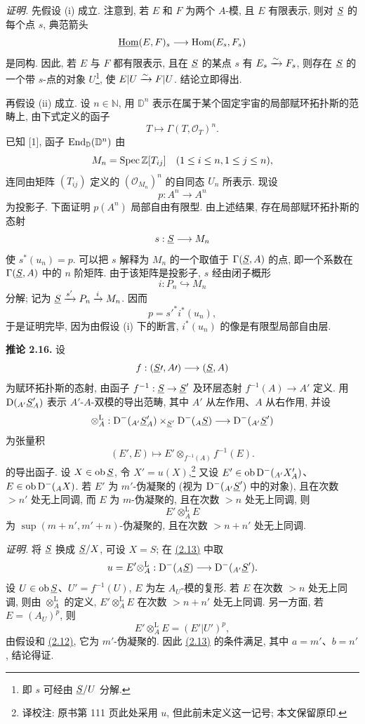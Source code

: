 \emph{证明.} 先假设 (i) 成立. 注意到, 若 \(E\) 和 \(F\) 为两个 \(A\)-模, 且 \(E\) 有限表示, 则对 \(\underline S\) 的每个点 \(s\), 典范箭头
\[
  \underline{\operatorname{Hom}}(E,F)_s\longrightarrow \operatorname{Hom}(E_s,F_s)
\]
是同构. 因此, 若 \(E\) 与 \(F\) 都有限表示, 且在 \(\underline S\) 的某点 \(s\) 有 \(E_s\xrightarrow{\sim} F_s\), 则存在 \(\underline S\) 的一个带 \(s\)-点的对象 \(U\)\footnote{即 \(s\) 可经由 \(\underline S/U\) 分解.}, 使 \(E|U\xrightarrow{\sim} F|U\). 结论立即得出.

再假设 (ii) 成立. 设 \(n\in\mathbb N\), 用 \(\mathbb D^n\) 表示在属于某个固定宇宙的局部赋环拓扑斯的范畴上, 由下式定义的函子
\[
  T\longmapsto \Gamma(T,\mathcal O_T)^n.
\]
已知 [1], 函子 \(\operatorname{End}_{\mathbb D}(\mathbb D^n)\) 由
\[
  M_n=\operatorname{Spec}\mathbb Z[T_{ij}]\quad(1\leq i\leq n,
  1\leq j\leq n),
\]
连同由矩阵 \((T_{ij})\) 定义的 \((\mathcal O_{M_n})^n\) 的自同态 \(U_n\) 所表示. 现设
\[
  p:A^n\longrightarrow A^n
\]
为投影子. 下面证明 \(p(A^n)\) 局部自由有限型. 由上述结果, 存在局部赋环拓扑斯的态射
\[
  s:\underline S\longrightarrow M_n
\]
使 \(s^*(u_n)=p\). 可以把 \(s\) 解释为 \(M_n\) 的一个取值于 \(\Gamma(\underline S,A)\) 的点, 即一个系数在 \(\Gamma(\underline S,A)\) 中的 \(n\) 阶矩阵. 由于该矩阵是投影子, \(s\) 经由闭子概形
\[
  i:P_n\hookrightarrow M_n
\]
分解; 记为 \(\underline S\xrightarrow{s'}P_n\xrightarrow{i}M_n\). 因而
\[
  p=s'^* i^*(u_n),
\]
于是证明完毕, 因为由假设 (i) 下的断言, \(i^*(u_n)\) 的像是有限型局部自由层.

\textbf{推论 2.16.} 设
\[
  f:(\underline S\prime,A\prime)\longrightarrow (\underline S,A)
\]
为赋环拓扑斯的态射, 由函子 \(f^{-1}:\underline S\to \underline S'\) 及环层态射 \(f^{-1}(A)\to A'\) 定义. 用 \(\mathrm D(_{A'}\underline S'_A)\) 表示 \(A'\)-\(A\)-双模的导出范畴, 其中 \(A'\) 从左作用、\(A\) 从右作用, 并设
\[
  \otimes_A^{\mathrm L}:\mathrm D^-(_{A'}\underline S'_A)\times_{\underline S'}\mathrm D^-(_A \underline S)
  \longrightarrow \mathrm D^-(_{A'}\underline S')
\]
为张量积
\[
  (E',E)\longmapsto E'\otimes_{f^{-1}(A)} f^{-1}(E).
\]
的导出函子. 设 \(X\in\operatorname{ob}\underline S\), 令 \(X'=u(X)\),\footnote{译校注: 原书第 111 页此处采用 \(u\), 但此前未定义这一记号; 本文保留原印.} 又设 \(E'\in\operatorname{ob}\mathrm D^-(_{A'}X'_A)\)、\(E\in\operatorname{ob}\mathrm D^-(_A X)\). 若 \(E'\) 为 \(m'\)-伪凝聚的 (视为 \(\mathrm D^-(_{A'}\underline S')\) 中的对象), 且在次数 \(>n'\) 处无上同调, 而 \(E\) 为 \(m\)-伪凝聚的, 且在次数 \(>n\) 处无上同调, 则
\[
  E'\otimes_A^{\mathrm L}E
\]
为 \(\sup(m+n',m'+n)\)-伪凝聚的, 且在次数 \(>n+n'\) 处无上同调.

\emph{证明.} 将 \(\underline S\) 换成 \(\underline S/X\), 可设 \(X=S\); 在 \hyperlink{sga6.e01.prop.2-13}{(2.13)} 中取
\[
  u=E'\otimes_A^{\mathrm L}:\mathrm D^-(_A \underline S)\longrightarrow \mathrm D^-(_{A'}\underline S').
\]
设 \(U\in\operatorname{ob}\underline S\)、\(U'=f^{-1}(U)\), \(E\) 为左 \(A_U\)-模的复形. 若 \(E\) 在次数 \(>n\) 处无上同调, 则由 \(\otimes_A^{\mathrm L}\) 的定义, \(E'\otimes_A^{\mathrm L}E\) 在次数 \(>n+n'\) 处无上同调. 另一方面, 若 \(E=(A_U)^p\), 则
\[
  E'\otimes_A^{\mathrm L}E=(E'|U')^p,
\]
由假设和 \hyperlink{sga6.e01.prop.2-12}{(2.12)}, 它为 \(m'\)-伪凝聚的. 因此 \hyperlink{sga6.e01.prop.2-13}{(2.13)} 的条件满足, 其中 \(a=m'\)、\(b=n'\), 结论得证.

